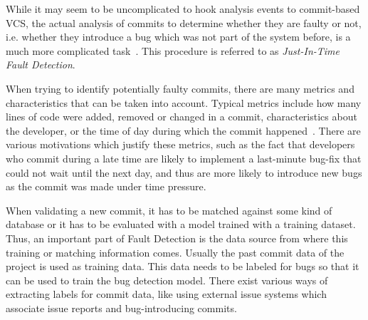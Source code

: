 While it may seem to be uncomplicated to hook analysis events to commit-based VCS, the actual analysis of commits to determine whether they are faulty or not, i.e. whether they introduce a bug which was not part of the system before, is a much more complicated task~\cite{Nayrolles2018, Kamei2013}. This procedure is referred to as \textit{Just-In-Time Fault Detection}.

When trying to identify potentially faulty commits, there are many metrics and characteristics that can be taken into account. Typical metrics include how many lines of code were added, removed or changed in a commit, characteristics about the developer, or the time of day during which the commit happened~\cite{Goyal2017}. There are various motivations which justify these metrics, such as the fact that developers who commit during a late time are likely to implement a last-minute bug-fix that could not wait until the next day, and thus are more likely to introduce new bugs as the commit was made under time pressure.


When validating a new commit, it has to be matched against some kind of database or it has to be evaluated with a model trained with a training dataset. Thus, an important part of Fault Detection is the data source from where this training or matching information comes. Usually the past commit data of the project is used as training data.
This data needs to be labeled for bugs so that it can be used to train the bug detection model. There exist various ways of extracting labels for commit data, like using external issue systems which associate issue reports and bug-introducing commits.


